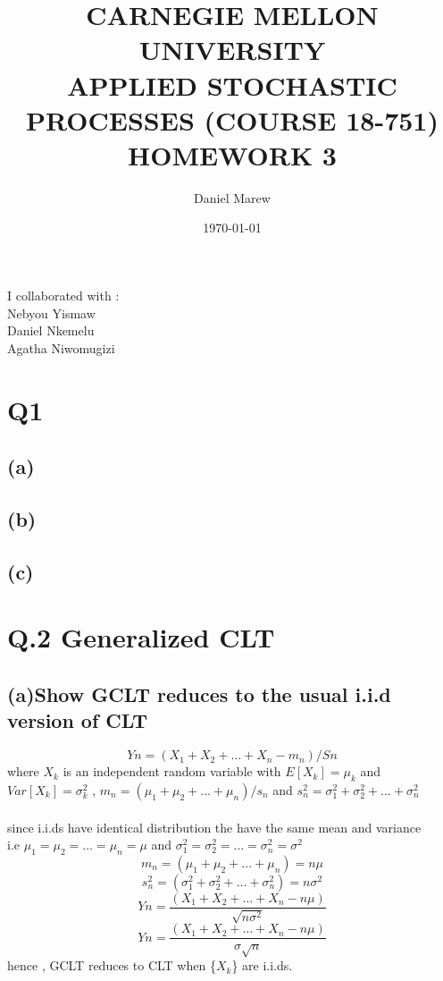 \documentclass[a4paper,11pt]{article}
\begin{document}
\title{\color{red}CARNEGIE MELLON UNIVERSITY\\
APPLIED STOCHASTIC PROCESSES  (COURSE 18-751)\\
HOMEWORK 3}
\author{Daniel Marew}
\date{\today}
\clearpage\maketitle

\thispagestyle{empty}
\newpage
I collaborated with :\\
\hspace*{6cm}
Nebyou Yismaw\\
\hspace*{6cm}
Daniel    Nkemelu\\
\hspace*{6cm}
Agatha Niwomugizi
\thispagestyle{empty}
\newpage
\clearpage
\setcounter{page}{1}

\section*{Q1}
\subsection*{(a)}
\subsection*{(b)}
\subsection*{(c)}

\newpage
\section*{Q.2 Generalized CLT}
\subsection*{(a)\quad Show GCLT reduces to the usual i.i.d version of CLT}
$$Yn = (X_1+X_2+ \dots +X_n-m_n)/Sn$$
where $X_k$ is an independent random variable with $E[X_k]=\mu_k$ and $Var[X_k]= \sigma_k^2$ ,
$m_n = (\mu_1+\mu_2+\dots +\mu_n)/s_n$ and $s_n^2=\sigma_1^2+\sigma_2^2+\dots+\sigma_n^2$\\\\
since i.i.ds have identical distribution the have the same mean and variance\\
i.e $\mu_1=\mu_2=\dots =\mu_n=\mu$ and $\sigma_1^2=\sigma_2^2=\dots=\sigma_n^2=\sigma^2$ \\
$$m_n = (\mu_1+\mu_2+\dots +\mu_n)=n\mu$$
$$s_n^2=(\sigma_1^2+\sigma_2^2+\dots+\sigma_n^2)=n\sigma^2$$
$$Yn = \frac{(X_1+X_2+ \dots +X_n-n\mu)}{\sqrt{n\sigma^2}}$$
$$Yn = \frac{(X_1+X_2+ \dots +X_n-n\mu)}{\sigma\sqrt{n}}$$
hence , GCLT reduces to CLT when \{$X_k$\} are i.i.ds.
\newpage
\end{document}

